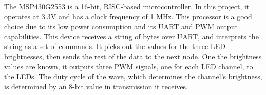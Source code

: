 
The MSP430G2553 is a 16-bit, RISC-based microcontroller. In this project, it operates at 3.3V and has a clock frequency of 1 MHz. This processor is a good choice due to its low power consumption and its UART and PWM output capabilities. This device receives a string of bytes over UART, and interprets the string as a set of commands. It picks out the values for the three LED brightnesses, then sends the rest of the data to the next node. One the brightness values are known, it outputs three PWM signals, one for each LED channel, to the LEDs. The duty cycle of the wave, which determines the channel's brightness, is determined by an 8-bit value in transmission it receives.

